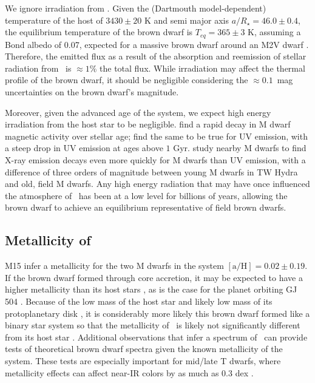 We ignore irradiation from \LA.
Given the (Dartmouth model-dependent) temperature of the host of $3430 \pm 20$ K 
and semi major axis $a/R_\star = 46.0 \pm 0.4$, the equilibrium temperature
of the brown dwarf is $T_{eq} = 365\pm 3$ K, assuming a Bond albedo of 0.07, expected for 
a massive brown dwarf around an M2V dwarf \citep{Marley99}.
Therefore, the emitted flux as a result of the absorption and reemission of stellar 
radiation from \LA\ is $\approx 1\%$ the total flux. 
While irradiation may affect the thermal profile of the brown dwarf, it should
be negligible considering the $\approx 0.1$~mag uncertainties on the brown dwarf's 
magnitude.

Moreover, given the advanced age of the system, we expect high energy 
irradiation from the host star to be negligible. \citet{West08} find a rapid decay
in M dwarf magnetic activity over stellar age; \citet{Shkolnik14}
find the same to be true for UV emission, with a steep drop in UV emission at ages
above $1$ Gyr.
\citet{Stelzer13} study nearby M dwarfs to find X-ray emission decays even more quickly
for M dwarfs than UV emission, with a difference of three orders of magnitude between 
young M dwarfs in TW Hydra and old, field M dwarfs.
Any high energy radiation that may have once influenced the atmosphere of \LC\ has 
been at a low level for billions of years, allowing the brown dwarf to 
achieve an equilibrium representative of field brown dwarfs.

\subsection{Metallicity of \LC}

M15 infer a metallicity for the two M dwarfs in the system 
$[\textrm{a/H}] = 0.02 \pm 0.19$.
If the brown dwarf formed through core accretion, it may be expected to have
a higher metallicity than its host stars \citep{Pollack86, Podolak88},
as is the case for the planet orbiting GJ\,504 \citep{Skemer16}. 
Because of the low mass of the host star and likely low mass of its protoplanetary disk
\citep{Andrews13}, it is considerably more likely this brown dwarf formed like a binary
star system so that the metallicity of \LC\ is likely not significantly different from its
host star \citep{Desidera04}.
Additional observations that infer a spectrum of \LC\ can provide 
tests of theoretical brown dwarf spectra given the known metallicity of the system.
These tests are especially important for mid/late T dwarfs, where metallicity effects
can affect near-IR colors by as much as 0.3 dex \citep{Burningham13}.



